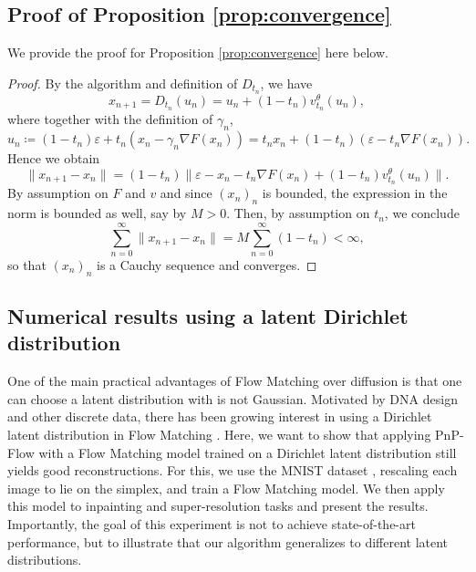 \documentclass{article} %
\theoremstyle{definition}
\begin{document}
\subsection{Proof of Proposition \ref{prop:convergence}}\label{sec:app_proof}

We provide the proof for Proposition \ref{prop:convergence} here below.

\begin{proof} By the algorithm and definition of $D_{t_n}$, we have
$$
x_{n+1} = D_{t_n} (u_n) = u_n + (1-t_n) v_{t_n}^\theta (u_n),
$$
where together with the definition of $\gamma_n$,
$$
u_n \coloneqq (1-t_n) \varepsilon 
+ t_n \left(x_n - \gamma_n \nabla F(x_n) \right) = t_n x_n   +
(1-t_n) \left(\varepsilon - t_n \nabla F(x_n) \right).
$$
Hence we obtain
$$
\|x_{n+1} - x_n\| = (1-t_n) \| \varepsilon -x_n - t_n\nabla F(x_n) + (1-t_n) v_{t_n}^\theta (u_n) \|.
$$
By assumption on $F$ and $v$ and since $(x_n)_n$ is bounded, the expression in the norm is bounded as well, say by $M >0$. Then, by  assumption on $t_n$, we conclude
\begin{equation}
\sum_{n=0}^{\infty} \|x_{n+1} - x_n\| = M \sum_{n=0}^{\infty} (1-t_n) < \infty,
\end{equation}
so that $(x_n)_n$ is a Cauchy sequence and converges.
\end{proof}




\subsection{Numerical results using a latent Dirichlet distribution}\label{sec:app_dirichlet}

 One of the main practical advantages of Flow Matching over diffusion is that one can choose a latent distribution with is not Gaussian. Motivated by DNA design and other discrete data, there has been growing interest in using a Dirichlet latent distribution in Flow Matching \citep{stark2024dirichlet, boll2024, davis2024}. Here, we want to show that applying PnP-Flow with a Flow Matching model trained on a Dirichlet latent distribution still yields good reconstructions. For this, we use the MNIST dataset \citep{mnist}, rescaling each image to lie on the simplex, and train a Flow Matching model. We then apply this model to inpainting and super-resolution tasks and present the results. Importantly, the goal of this experiment is not to achieve state-of-the-art performance, but to illustrate that our algorithm generalizes to different latent distributions.
\end{document}
